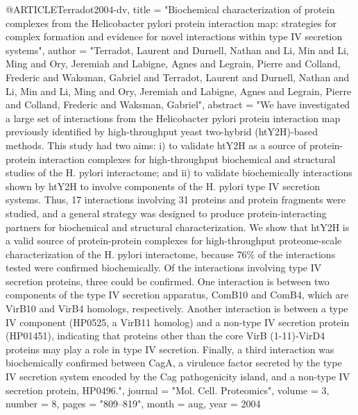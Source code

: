 @ARTICLE{Terradot2004-dv,
  title    = "Biochemical characterization of protein complexes from the
              Helicobacter pylori protein interaction map: strategies for
              complex formation and evidence for novel interactions within type
              {IV} secretion systems",
  author   = "Terradot, Laurent and Durnell, Nathan and Li, Min and Li, Ming
              and Ory, Jeremiah and Labigne, Agnes and Legrain, Pierre and
              Colland, Frederic and Waksman, Gabriel and Terradot, Laurent and
              Durnell, Nathan and Li, Min and Li, Ming and Ory, Jeremiah and
              Labigne, Agnes and Legrain, Pierre and Colland, Frederic and
              Waksman, Gabriel",
  abstract = "We have investigated a large set of interactions from the
              Helicobacter pylori protein interaction map previously identified
              by high-throughput yeast two-hybrid (htY2H)-based methods. This
              study had two aims: i) to validate htY2H as a source of
              protein-protein interaction complexes for high-throughput
              biochemical and structural studies of the H. pylori interactome;
              and ii) to validate biochemically interactions shown by htY2H to
              involve components of the H. pylori type IV secretion systems.
              Thus, 17 interactions involving 31 proteins and protein fragments
              were studied, and a general strategy was designed to produce
              protein-interacting partners for biochemical and structural
              characterization. We show that htY2H is a valid source of
              protein-protein complexes for high-throughput proteome-scale
              characterization of the H. pylori interactome, because 76\% of
              the interactions tested were confirmed biochemically. Of the
              interactions involving type IV secretion proteins, three could be
              confirmed. One interaction is between two components of the type
              IV secretion apparatus, ComB10 and ComB4, which are VirB10 and
              VirB4 homologs, respectively. Another interaction is between a
              type IV component (HP0525, a VirB11 homolog) and a non-type IV
              secretion protein (HP01451), indicating that proteins other than
              the core VirB (1-11)-VirD4 proteins may play a role in type IV
              secretion. Finally, a third interaction was biochemically
              confirmed between CagA, a virulence factor secreted by the type
              IV secretion system encoded by the Cag pathogenicity island, and
              a non-type IV secretion protein, HP0496.",
  journal  = "Mol. Cell. Proteomics",
  volume   =  3,
  number   =  8,
  pages    = "809--819",
  month    =  aug,
  year     =  2004
}

